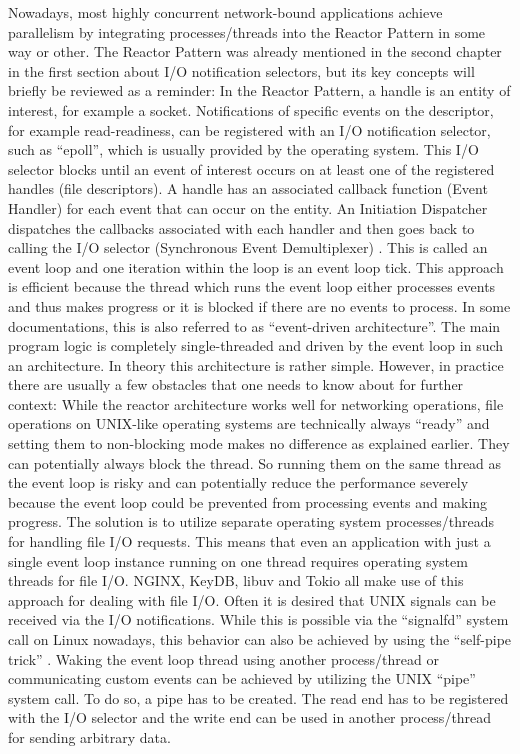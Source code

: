 Nowadays, most highly concurrent network-bound applications achieve parallelism by integrating processes/threads into the Reactor Pattern in some way or other. The Reactor Pattern was already mentioned in the second chapter in the first section about I/O notification selectors, but its key concepts will briefly be reviewed as a reminder: \newline In the Reactor Pattern, a handle is an entity of interest, for example a socket. Notifications of specific events on the descriptor, for example read-readiness, can be registered with an I/O notification selector, such as “epoll”, which is usually provided by the operating system. This I/O selector blocks until an event of interest occurs on at least one of the registered handles (file descriptors). A handle has an associated callback function (Event Handler) for each event that can occur on the entity. An Initiation Dispatcher dispatches the callbacks associated with each handler and then goes back to calling the I/O selector (Synchronous Event Demultiplexer) \cite{schmidt:reactor}. This is called an event loop and one iteration within the loop is an event loop tick. This approach is efficient because the thread which runs the event loop either processes events and thus makes progress or it is blocked if there are no events to process. In some documentations, this is also referred to as “event-driven architecture”. The main program logic is completely single-threaded and driven by the event loop in such an architecture. In theory this architecture is rather simple. However, in practice there are usually a few obstacles that one needs to know about for further context: \newline
While the reactor architecture works well for networking operations, file operations on UNIX-like operating systems are technically always “ready” and setting them to non-blocking mode makes no difference as explained earlier. They can potentially always block the thread. So running them on the same thread as the event loop is risky and can potentially reduce the performance severely because the event loop could be prevented from processing events and making progress. The solution is to utilize separate operating system processes/threads for handling file I/O requests. This means that even an application with just a single event loop instance running on one thread requires operating system threads for file I/O. NGINX, KeyDB, libuv and Tokio all make use of this approach for dealing with file I/O. \newline
Often it is desired that UNIX signals can be received via the I/O notifications. While this is possible via the “signalfd” system call \cite{man:signalfd} on Linux nowadays, this behavior can also be achieved by using the “self-pipe trick” \cite[1370-1372]{kerrisk:linuxapi}. \newline
Waking the event loop thread using another process/thread or communicating custom events can be achieved by utilizing the UNIX “pipe” system call. To do so, a pipe has to be created. The read end has to be registered with the I/O selector and the write end can be used in another process/thread for sending arbitrary data. 

